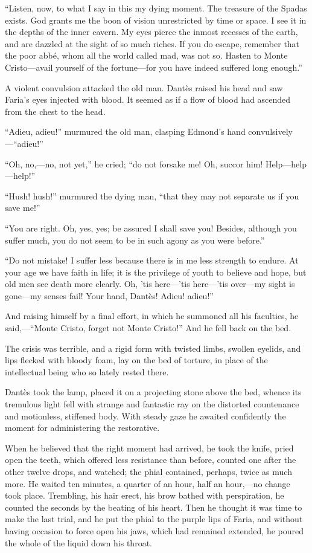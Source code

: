 “Listen, now, to what I say in this my dying moment. The treasure of
the Spadas exists. God grants me the boon of vision unrestricted by
time or space. I see it in the depths of the inner cavern. My eyes
pierce the inmost recesses of the earth, and are dazzled at the sight
of so much riches. If you do escape, remember that the poor abbé, whom
all the world called mad, was not so. Hasten to Monte Cristo—avail
yourself of the fortune—for you have indeed suffered long enough.”

A violent convulsion attacked the old man. Dantès raised his head and
saw Faria’s eyes injected with blood. It seemed as if a flow of blood
had ascended from the chest to the head.

“Adieu, adieu!” murmured the old man, clasping Edmond’s hand
convulsively—“adieu!”

“Oh, no,—no, not yet,” he cried; “do not forsake me! Oh, succor him!
Help—help—help!”

“Hush! hush!” murmured the dying man, “that they may not separate us if
you save me!”

“You are right. Oh, yes, yes; be assured I shall save you! Besides,
although you suffer much, you do not seem to be in such agony as you
were before.”

“Do not mistake! I suffer less because there is in me less strength to
endure. At your age we have faith in life; it is the privilege of youth
to believe and hope, but old men see death more clearly. Oh, ’tis
here—’tis here—’tis over—my sight is gone—my senses fail! Your hand,
Dantès! Adieu! adieu!”

And raising himself by a final effort, in which he summoned all his
faculties, he said,—“Monte Cristo, forget not Monte Cristo!” And he
fell back on the bed.

The crisis was terrible, and a rigid form with twisted limbs, swollen
eyelids, and lips flecked with bloody foam, lay on the bed of torture,
in place of the intellectual being who so lately rested there.

Dantès took the lamp, placed it on a projecting stone above the bed,
whence its tremulous light fell with strange and fantastic ray on the
distorted countenance and motionless, stiffened body. With steady gaze
he awaited confidently the moment for administering the restorative.

When he believed that the right moment had arrived, he took the knife,
pried open the teeth, which offered less resistance than before,
counted one after the other twelve drops, and watched; the phial
contained, perhaps, twice as much more. He waited ten minutes, a
quarter of an hour, half an hour,—no change took place. Trembling, his
hair erect, his brow bathed with perspiration, he counted the seconds
by the beating of his heart. Then he thought it was time to make the
last trial, and he put the phial to the purple lips of Faria, and
without having occasion to force open his jaws, which had remained
extended, he poured the whole of the liquid down his throat.

